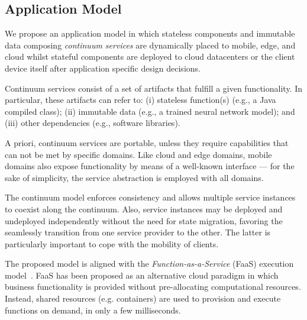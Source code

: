 



\subsection{Application Model}\label{sec:application_model}

We propose an application model in which stateless components and immutable data composing \textit{continuum services} are dynamically placed to mobile, edge, and cloud
whilst 
stateful components are deployed to cloud datacenters or the client device itself after application specific design decisions.

Continuum services consist of a set of artifacts that fulfill a given functionality. In particular, these artifacts can refer to: (i) stateless function(s) (e.g., a Java compiled class); (ii) immutable data (e.g., a trained neural network model); and (iii) other dependencies (e.g., software libraries).

A priori, continuum services are portable, unless they require capabilities that can not be met by specific domains. Like cloud and edge domains, mobile domains also expose functionality by means of a well-known interface --- for the sake of simplicity, the service abstraction is employed with all domains.

The continuum model enforces consistency and allows multiple service instances to coexist along the continuum. Also, service instances may be deployed and undeployed independently without the need for state migration, favoring the seamlessly transition from one service provider to the other. The latter is particularly important to cope with the mobility of clients.

The proposed model is aligned with the \textit{Function-as-a-Service} (FaaS) execution model~\cite{MateosFaaster17}. FaaS has been proposed as an alternative cloud paradigm in which business functionality is provided without pre-allocating computational resources. Instead, shared resources (e.g. containers) are used to provision and execute functions on demand, in only a few milliseconds. 

